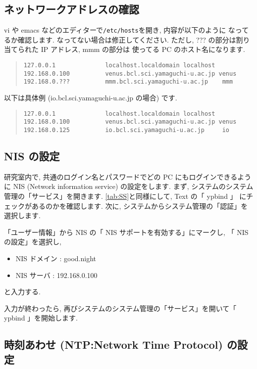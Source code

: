 \documentclass{jarticle}
\begin{document}
\subsection{ネットワークアドレスの確認}

vi や emacs などのエディターで\verb|/etc/hosts|を開き, 内容が以下のように
なってるか確認します. なってない場合は修正してください.
ただし, ??? の部分は割り当てられた IP アドレス, mmm の部分は
使ってる PC のホスト名になります.
\begin{quote}
\begin{verbatim}
127.0.0.1              localhost.localdomain localhost
192.168.0.100          venus.bcl.sci.yamaguchi-u.ac.jp venus
192.168.0.???          mmm.bcl.sci.yamaguchi-u.ac.jp    mmm
\end{verbatim}
\end{quote}
以下は具体例 (io.bcl.sci.yamaguchi-u.ac.jp の場合) です.
\begin{quote}
\begin{verbatim}
127.0.0.1              localhost.localdomain localhost
192.168.0.100          venus.bcl.sci.yamaguchi-u.ac.jp venus
192.168.0.125          io.bcl.sci.yamaguchi-u.ac.jp     io
\end{verbatim}
\end{quote}



\subsection{NIS の設定}
研究室内で, 共通のログイン名とパスワードでどの PC にもログインできるよう
に NIS (Network information service) の設定をします.
まず, システムのシステム管理の「サービス」を開きます. \ref{tab:SS}と同様にして, Text の「 ypbind 」
にチェックがあるのかを確認します.
次に, システムからシステム管理の「認証」を選択します.

「ユーザー情報」から NIS の「 NIS サポートを有効する」にマークし, 「 NIS の設定」を選択し,
\begin{itemize}
	\item NIS ドメイン : good.night
	\item NIS サーバ : 192.168.0.100
\end{itemize}
と入力する.

入力が終わったら, 再びシステムのシステム管理の「サービス」を開いて「 ypbind 」を開始します.



\subsection{時刻あわせ (NTP:Network Time Protocol) の設定}
\end{document}
